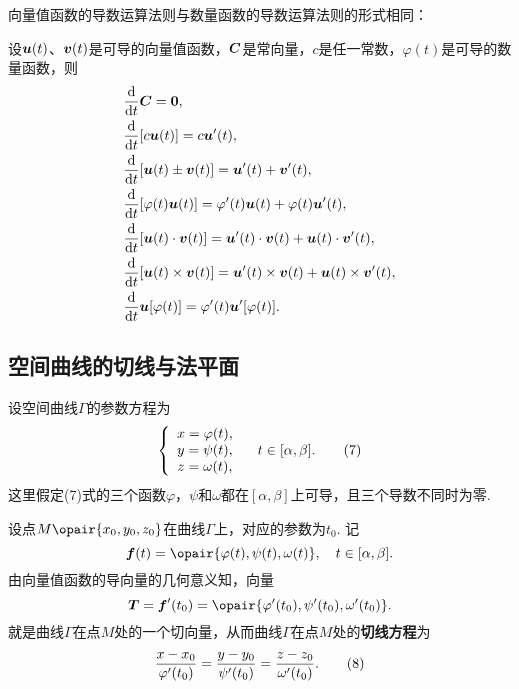 向量值函数的导数运算法则与数量函数的导数运算法则的形式相同：
\begin{theorem}[向量值函数的导数运算法则]
设\(\boldsymbol{u}(t)\)、\(\boldsymbol{v}(t)\)是可导的向量值函数，\(\boldsymbol{C}\)是常向量，\(c\)是任一常数，\(\varphi(t)\)是可导的数量函数，则\begin{align}
&\dv{t} \boldsymbol{C} = \boldsymbol{0}, \\
&\dv{t} [c \boldsymbol{u}(t)] = c \boldsymbol{u}'(t), \\
&\dv{t} [\boldsymbol{u}(t) \pm \boldsymbol{v}(t)] = \boldsymbol{u}'(t) + \boldsymbol{v}'(t), \\
&\dv{t} [\varphi(t) \boldsymbol{u}(t)] = \varphi'(t) \boldsymbol{u}(t) + \varphi(t) \boldsymbol{u}'(t), \\
&\dv{t} [\boldsymbol{u}(t) \cdot \boldsymbol{v}(t)] = \boldsymbol{u}'(t) \cdot \boldsymbol{v}(t) + \boldsymbol{u}(t) \cdot \boldsymbol{v}'(t), \\
&\dv{t} [\boldsymbol{u}(t) \times \boldsymbol{v}(t)] = \boldsymbol{u}'(t) \times \boldsymbol{v}(t) + \boldsymbol{u}(t) \times \boldsymbol{v}'(t), \\
&\dv{t} \boldsymbol{u}[\varphi(t)] = \varphi'(t) \boldsymbol{u}'[\varphi(t)].
\end{align}
\end{theorem}

\subsection{空间曲线的切线与法平面}
设空间曲线\(\Gamma\)的参数方程为\begin{gather}
\left\{ \begin{array}{c}
x = \varphi(t), \\
y = \psi(t), \\
z = \omega(t), \\
\end{array} \right.
\quad
t \in [\alpha,\beta].
\tag7
\end{gather}这里假定(7)式的三个函数\(\varphi\)，\(\psi\)和\(\omega\)都在\([\alpha,\beta]\)上可导，且三个导数不同时为零.

设点\(M\opair{x_0,y_0,z_0}\)在曲线\(\Gamma\)上，对应的参数为\(t_0\).
记\[
\mat{f}(t)=\opair{\varphi(t),\psi(t),\omega(t)},
\quad t\in[\alpha,\beta].
\]由向量值函数的导向量的几何意义知，向量
\begin{equation}
\mat{T} = \mat{f}'(t_0) = \opair{\varphi'(t_0),\psi'(t_0),\omega'(t_0)}.
\end{equation}
就是曲线\(\Gamma\)在点\(M\)处的一个切向量，从而曲线\(\Gamma\)在点\(M\)处的\textbf{切线方程}为\begin{gather}
\frac{x-x_0}{\varphi'(t_0)}
=\frac{y-y_0}{\psi'(t_0)}
=\frac{z-z_0}{\omega'(t_0)}.
\tag8
\end{gather}

